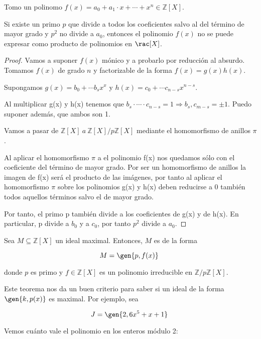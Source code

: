 \documentclass[nochap]{apuntes}
\begin{document}
\begin{theorem}\label{thmEisenstein}
 Tomo un polinomo $f(x)=a_0  +  a_1\cdot x + \cdots + x^{n} \in \mathbb{Z}[X]$.

 Si existe un primo $p$ que divide a todos los coeficientes salvo al del término de mayor grado y $p^2$  no divide a $a_0$, entonces el polinomio $f(x)$ no se puede expresar como producto de polinomios en $\rac[X]$.
\end{theorem}

\begin{proof}
 Vamos a suponer $f(x)$ mónico y a probarlo por reducción al absurdo. Tomamos $f(x)$ de grado $n$ y factorizable de la forma $f(x)=g(x)h(x)$.

 Supongamos $g(x)=b_0+\cdots b_sx^{x}$ y $h(x)=c_0 +\cdots c_{n-s}x^{n-s}$.

 Al multiplicar g(x) y h(x) tenemos que $b_s \cdot \dotsb \cdot c_{n-s} = 1 \Rightarrow b_s,c_{m-s} = \pm 1$. Puedo suponer además, que ambos son 1.

 Vamos a pasar de $\mathbb{Z}[X] \ a \ \mathbb{Z}[X]/p\mathbb{Z}[X]$  mediante el homomorfismo de anillos $\pi$.

 Al aplicar el homomorfismo $\pi$  a el polinomio f(x) nos quedamos sólo con el coeficiente del término de mayor grado. Por ser un homomorfismo de anillos la imagen de f(x) será el producto de las imágenes, por tanto al aplicar el homomorfismo $\pi$  sobre los polinomios g(x) y h(x)  deben reducirse a 0 también todos aquellos términos salvo el de mayor grado.

 Por tanto, el primo p también divide a los coeficientes de g(x) y de h(x). En particular, p divide a $b_0$  y a $c_0$, por tanto $p^2$  divide a $a_0$.
\end{proof}

\begin{theorem}\label{thmMaximalIrreducibleZ} Sea $M⊆ℤ[X]$ un ideal maximal. Entonces, $M$ es de la forma

\[ M = \gen{p, f(x)} \]

donde $p$ es primo y $f∈ℤ[X]$ es un polinomio irreducible en $ℤ/pℤ[X]$.
\end{theorem}

Este teorema nos da un buen criterio para saber si un ideal de la forma $\gen{k, p(x)}$ es maximal. Por ejemplo, sea

\[ J = \gen{2, 6x^5 + x + 1} \]

Vemos cuánto vale el polinomio en los enteros módulo 2:
\end{document}
